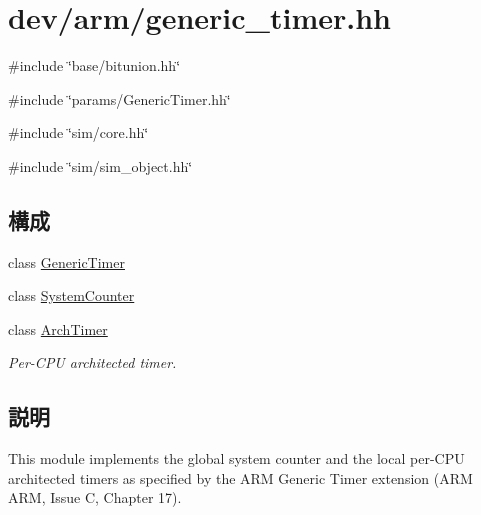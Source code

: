\hypertarget{generic__timer_8hh}{
\section{dev/arm/generic\_\-timer.hh}
\label{generic__timer_8hh}
}
{\ttfamily \#include \char`\"{}base/bitunion.hh\char`\"{}}\par
{\ttfamily \#include \char`\"{}params/GenericTimer.hh\char`\"{}}\par
{\ttfamily \#include \char`\"{}sim/core.hh\char`\"{}}\par
{\ttfamily \#include \char`\"{}sim/sim\_\-object.hh\char`\"{}}\par
\subsection*{構成}
\begin{DoxyCompactItemize}
\item 
class \hyperlink{classGenericTimer}{GenericTimer}
\item 
class \hyperlink{classGenericTimer_1_1SystemCounter}{SystemCounter}
\item 
class \hyperlink{classGenericTimer_1_1ArchTimer}{ArchTimer}
\begin{DoxyCompactList}\small\item\em Per-\/CPU architected timer. \item\end{DoxyCompactList}\end{DoxyCompactItemize}


\subsection{説明}
This module implements the global system counter and the local per-\/CPU architected timers as specified by the ARM Generic Timer extension (ARM ARM, Issue C, Chapter 17). 